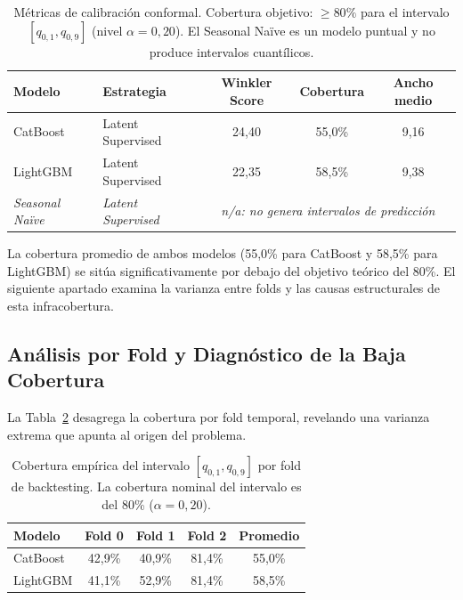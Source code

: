 \begin{table}[htbp]
    \centering
    \small
    \begin{tabular}{llccc}
        \toprule
        \textbf{Modelo} & \textbf{Estrategia} & \textbf{Winkler Score} & \textbf{Cobertura} & \textbf{Ancho medio} \\
        \midrule
        CatBoost & Latent Supervised & 24,40 & 55,0\% & 9,16 \\
        LightGBM & Latent Supervised & 22,35 & 58,5\% & 9,38 \\
        \textit{Seasonal Naïve} & \textit{Latent Supervised} & \multicolumn{3}{c}{\textit{n/a: no genera intervalos de predicción}} \\
        \bottomrule
    \end{tabular}
    \caption[Métricas de calibración conformal]{Métricas de calibración conformal. Cobertura objetivo: $\geq 80\%$ para el intervalo $[q_{0{,}1}, q_{0{,}9}]$ (nivel $\alpha = 0{,}20$). El Seasonal Naïve es un modelo puntual y no produce intervalos cuantílicos.}
    \label{tab:conformal_metrics}
\end{table}

La cobertura promedio de ambos modelos (55,0\% para CatBoost y 58,5\% para LightGBM) se sitúa significativamente por debajo del objetivo teórico del 80\%. El siguiente apartado examina la varianza entre folds y las causas estructurales de esta infracobertura.

\subsection{Análisis por Fold y Diagnóstico de la Baja Cobertura}
\label{sec:analisis_folds}

La Tabla~\ref{tab:fold_coverage} desagrega la cobertura por fold temporal, revelando una varianza extrema que apunta al origen del problema.

\begin{table}[htbp]
    \centering
    \small
    \begin{tabular}{lcccc}
        \toprule
        \textbf{Modelo} & \textbf{Fold 0} & \textbf{Fold 1} & \textbf{Fold 2} & \textbf{Promedio} \\
        \midrule
        CatBoost     & 42,9\% & 40,9\% & 81,4\% & 55,0\% \\
        LightGBM     & 41,1\% & 52,9\% & 81,4\% & 58,5\% \\
        \bottomrule
    \end{tabular}
    \caption[Cobertura conformal por fold, subset base]{Cobertura empírica del intervalo $[q_{0{,}1}, q_{0{,}9}]$ por fold de backtesting. La cobertura nominal del intervalo es del 80\% ($\alpha = 0{,}20$).}
    \label{tab:fold_coverage}
\end{table}

